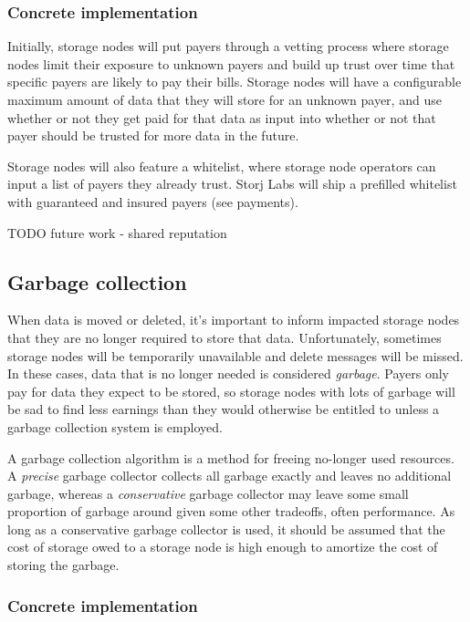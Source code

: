 \documentclass[a4paper,10pt]{article} \usepackage[utf8]{inputenc}
\newcommand{\todo}[1]{{\color{red} TODO #1 }}
\begin{document}
\subsubsection{Concrete implementation}

Initially, storage nodes will put payers through a vetting process
where storage nodes limit their exposure to unknown payers and build up trust
over time that specific payers are likely to pay their bills. Storage nodes
will have a configurable maximum amount of data that they will store for an
unknown payer, and use whether or not they get paid for that data as input into
whether or not that payer should be trusted for more data in the future.

Storage nodes will also feature a whitelist, where storage node operators can
input a list of payers they already trust. Storj Labs will ship a prefilled
whitelist with guaranteed and insured payers (see payments).

\todo{future work - shared reputation}

\subsection{Garbage collection}

When data is moved or deleted, it's important to inform impacted storage nodes
that they are no longer required to store that data. Unfortunately, sometimes
storage nodes will be temporarily unavailable and delete messages will be
missed. In these cases, data that is no longer needed is considered
{\em garbage}. Payers only pay for data they expect to be stored, so storage
nodes with lots of garbage will be sad to find less earnings than they would
otherwise be entitled to unless a garbage collection system is employed.

A garbage collection algorithm is a method for freeing no-longer used resources.
A {\em precise} garbage collector collects all garbage exactly and
leaves no additional garbage, whereas a {\em conservative} garbage collector may
leave some small proportion of garbage around given some other tradeoffs, often
performance. As long as a conservative garbage collector is used, it should
be assumed that the cost of storage owed to a storage node is high enough
to amortize the cost of storing the garbage.

\subsubsection{Concrete implementation}
\end{document}
